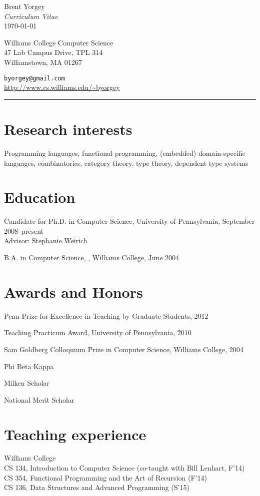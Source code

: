 \documentclass{article}
\newcommand{\cvitem}{\par\hangpara{2em}{1}}
\begin{document}
\begin{center}
  {\huge Brent Yorgey} \\
  \emph{Curriculum Vitae} \\
  \today
\end{center}

\noindent
\parbox{2.5in}{
Williams College Computer Science \\
47 Lab Campus Drive, TPL 314 \\
Williamstown, MA 01267
}
\hfill
\parbox{3in}{
\texttt{byorgey@gmail.com} \\
\url{http://www.cs.williams.edu/~byorgey}
}
\medskip

\hrule

\section*{Research interests}
Programming languages, functional programming, (embedded)
domain-specific languages, combinatorics, category theory, type
theory, dependent type systems

\section*{Education}
\cvitem
Candidate for Ph.D. in Computer Science, University of Pennsylvania,
September 2008--present \\
Advisor: Stephanie Weirich

\cvitem B.A. in Computer Science, , Williams
College, June 2004

\section*{Awards and Honors}
\cvitem Penn Prize for Excellence in Teaching by Graduate Students, 2012
\cvitem Teaching Practicum Award, University of Pennsylvania, 2010
\cvitem Sam Goldberg Colloquium Prize in Computer Science, Williams
College, 2004
\cvitem Phi Beta Kappa
\cvitem Milken Scholar
\cvitem National Merit Scholar

\section*{Teaching experience}

\cvitem
Williams College \\
CS 134, Introduction to Computer Science (co-taught with Bill Lenhart,
F'14) \\
CS 354, Functional Programming and the Art of Recursion (F'14) \\
CS 136, Data Structures and Advanced Programming (S'15)
\end{document}

